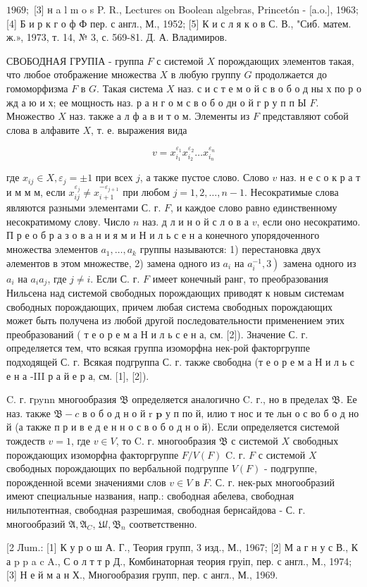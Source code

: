 \documentclass[10pt]{article}
\begin{document}
$1969 ;$ [3] н a l m o s P. R., Lectures on Boolean algebras, Princetón - [a.o.], 1963; [4] Б и р к г о ф Ф пер. с англ., М., 1952; [5] К и с л я к о в С. В., "Сиб. матем. ж.», 1973, т. 14, № 3, с. 569-81. Д. А. Владимиров.



СВОБОДНАЯ ГРУПІА - группа $F$ с системой $X$ порождающих элементов такая, что любое отображение множества $X$ в любую группу $G$ продолжается до гомоморфизма $F$ в $G$. Такая система $X$ наз. с и с т е м о й с в о б о д ны х по р о жд а ю и х; ее мощность наз. р а н г о м с в о б о дн о й г р у п п Ы $F$. Множество $X$ наз. также а л ф а в и т о м. Элементы из $F$ представляют собой слова в алфавите $X$, т. е. выражения вида



\[

v=x_{i_{1}}^{\varepsilon_{1}} x_{i_{2}}^{\varepsilon_{2}} \ldots x_{i_{n}}^{\varepsilon_{n}}

\]



где $x_{i j} \in X, \varepsilon_{j}= \pm 1$ при всех $j$, а также пустое слово. Слово $v$ наз. н е с о к р а т и м м м, если $x_{i j}^{\varepsilon_{j}} \neq x_{i+1}^{-\varepsilon_{j+1}}$ при любом $j=1,2, \ldots, n-1$. Несократимые слова являются разными элементами С. г. $F$, и каждое слово равно единственному несократимому слову. Число $n$ наз. д л и н о й с л о в а $v$, если оно несократимо. П р е о б р а з о в а н и я м и Н и л ь с е н а конечного упорядоченного множества элементов $a_{1}, \ldots, a_{k}$ группы называются: 1) перестановка двух әлементов в этом множестве, 2) замена одного из $a_{i}$ на $\left.a_{i}^{-1}, 3\right)$ замена одного из $a_{i}$ на $a_{i} a_{j}$, где $j \neq i$. Если С. г. $F$ имеет конечный ранг, то преобразования Нильсена над системой свободных порождающих приводят к новым системам свободных порождающих, причем любая система свободных порождающих может быть получена из любой другой последовательности применением этих преобразований ( т е о р е м а Н и л ь с е н а, см. [2]). Значение С. г. определяется тем, что всякая группа изоморфна нек-рой факторгруппе подходящей С. г. Всякая подгруппа С. г. также свободна (т е о р е м а Н и л ь с е н а -III р а й е р а, см. [1], [2]).



C. г. гpynn многообразия $\mathfrak{B}$ определяется аналогично C. г., но в пределах $\mathfrak{B}$. Ее наз. также $\mathfrak{B}-c$ в о б о д н о й r $\mathbf{p}$ у п по й, илио т нос и те льн о с во б о д но й (а также п р и в е д е н н о с в о б о д н о й). Если определяется системой тождеств $v=1$, где $v \in V$, то C. г. многообразия $\mathfrak{B}$ с системой $X$ свободных порождающих изоморфна факторгруппе $F / V(F)$ C. г. $F$ с системой $X$ свободных порождающих по вербальной подгруппе $V(F)$ - подгруппе, порожденной всеми значениями слов $v \in V$ в $F$. С. г. нек-рых многообразий имеют специальные названия, напр.: свободная абелева, свободная нильпотентная, свободная разрешимая, свободная бернсайдова - С. г. многообразий $\mathfrak{A}, \mathfrak{A}_{C}$, $\mathfrak{U} l, \mathfrak{B}_{n}$ соответственно.



[2 Лum.: [1] К у р о ш А. Г., Теория групп, 3 изд., М., 1967; [2] М а г н у с В., К а p p a c A., С о л т т р Д., Комбинаторная теория груіп, пер. с англ., М., 1974; [3] Н е й м а н Х., Многообразия групп, пер. с англ., М., 1969.
\end{document}
